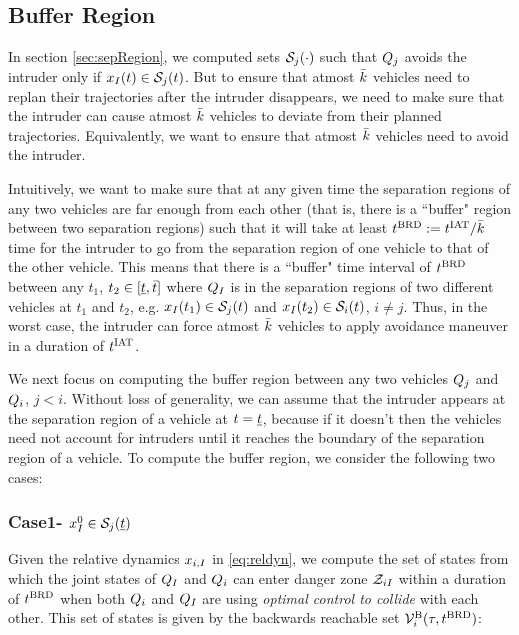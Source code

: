 \subsection{Buffer Region} \label{sec:buffRegion}
In section \ref{sec:sepRegion}, we computed sets $\mathcal{S}_j(\cdot)$ such that $Q_j$ avoids the intruder only if $x_{I}(t) \in \mathcal{S}_j(t)$. But to ensure that atmost $\bar{k}$ vehicles need to replan their trajectories after the intruder disappears, we need to make sure that the intruder can cause atmost $\bar{k}$ vehicles to deviate from their planned trajectories. Equivalently, we want to ensure that atmost $\bar{k}$ vehicles need to avoid the intruder. 

Intuitively, we want to make sure that at any given time the separation regions of any two vehicles are far enough from each other (that is, there is a ``buffer" region between two separation regions) such that it will take at least $t^\text{BRD} := t^\text{IAT} / \bar{k}$ time for the intruder to go from the separation region of one vehicle to that of the other vehicle. This means that there is a ``buffer" time interval of $t^\text{BRD}$ between any $t_1$, $t_2 \in [\underline{t}, \bar{t}]$ where $Q_{I}$ is in the separation regions of two different vehicles at $t_1$ and $t_2$, e.g. $x_{I}(t_1) \in \mathcal{S}_j(t)$ and $x_{I}(t_2) \in \mathcal{S}_i(t)$, $i \neq j$. Thus, in the worst case, the intruder can force atmost $\bar{k}$ vehicles to apply avoidance maneuver in a duration of $t^\text{IAT}$. 

We next focus on computing the buffer region between any two vehicles $Q_j$ and $Q_i$, $j < i$. Without loss of generality, we can assume that the intruder appears at the separation region of a vehicle at $t = \underline{t}$, because if it doesn't then the vehicles need not account for intruders until it reaches the boundary of the separation region of a vehicle. To compute the buffer region, we consider the following two cases:     

\subsubsection{Case1- $x_{I}^0 \in \mathcal{S}_j(\underline{t})$} \label{sec:buffCase1}
Given the relative dynamics $x_{i, I}$ in \eqref{eq:reldyn}, we compute the set of states from which the joint states of $Q_{I}$ and $Q_{i}$ can enter danger zone $\mathcal{Z}_{iI}$ within a duration of $t^\text{BRD}$ when both $Q_{i}$ and $Q_{I}$ are using \textit{optimal control to collide} with each other. This set of states is given by the backwards reachable set $\mathcal{V}^{\text{B}}_i(\tau, t^\text{BRD})$:

